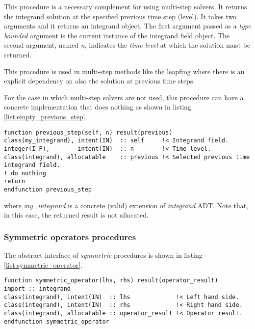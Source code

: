 \documentclass[pdftex,preprint,3p,times,numbers]{elsarticle}
\begin{document}
This procedure is a necessary complement for using multi-step solvers. It returns the integrand solution at the specified previous time step (level). It takes two arguments and it returns an integrand object. The first argument passed as a \emph{type bounded} argument is the current instance of the integrand field object. The second argument, named \emph{n}, indicates the \emph{time level} at which the solution must be returned.

This procedure is used in multi-step methods like the leapfrog where there is an explicit dependency on also the solution at previous time steps.

For the case in which multi-step solvers are not used, this procedure can have a concrete implementation that does nothing as shown in listing \ref{list:empty_previous_step}.

\begin{lstlisting}[firstnumber=1,style=code,caption={empty implementation of the previous step procedure},label={list:empty_previous_step}]
function previous_step(self, n) result(previous)
class(my_integrand), intent(IN)  :: self     !< Integrand field.
integer(I_P),        intent(IN)  :: n        !< Time level.
class(integrand), allocatable    :: previous !< Selected previous time integrand field.
! do nothing
return
endfunction previous_step
\end{lstlisting}
where \emph{my\_integrand} is a concrete (valid) extension of \emph{integrand} ADT. Note that, in this case, the returned result is not allocated.

\subsubsection{Symmetric operators procedures}

The abstract interface of \emph{symmetric} procedures is shown in listing \ref{list:symmetric_operator}.

\begin{lstlisting}[firstnumber=1,style=code,caption={symmetric operator procedure interface},label={list:symmetric_operator}]
function symmetric_operator(lhs, rhs) result(operator_result)
import :: integrand
class(integrand), intent(IN)  :: lhs             !< Left hand side.
class(integrand), intent(IN)  :: rhs             !< Right hand side.
class(integrand), allocatable :: operator_result !< Operator result.
endfunction symmetric_operator
\end{lstlisting}
\end{document}
